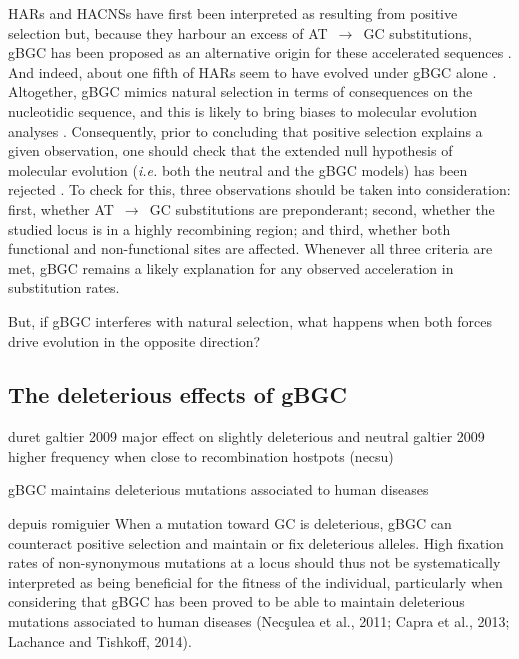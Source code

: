 HARs and HACNSs have first been interpreted as resulting from positive selection \citep[reviewed in][]{hubisz2014exploring} but, because they harbour an excess of AT~$\rightarrow$~GC substitutions, gBGC has been proposed as an alternative origin for these accelerated sequences \citep{galtier2007adaptation,berglund2009hotspots,duret2009comment,katzman2010gcbiased,ratnakumar2010detecting}.
And indeed, about one fifth of HARs seem to have evolved under gBGC alone \citep{kostka2012role}.\\


Altogether, gBGC mimics natural selection in terms of consequences on the nucleotidic sequence, and this is likely to bring biases to molecular evolution analyses \citep{ratnakumar2010detecting,romiguier2017analytical}.
Consequently, prior to concluding that positive selection explains a given observation, one should check that the extended null hypothesis of molecular evolution (\textit{i.e.} both the neutral and the gBGC models) has been rejected \citep{galtier2007adaptation, duret2009biased}.
To check for this, three observations should be taken into consideration: first, whether AT~$\rightarrow$~GC substitutions are preponderant; second, whether the studied locus is in a highly recombining region; and third, whether both functional and non-functional sites are affected.
Whenever all three criteria are met, gBGC remains a likely explanation for any observed acceleration in substitution rates.

But, if gBGC interferes with natural selection, what happens when both forces drive evolution in the opposite direction? 




\subsection{The deleterious effects of gBGC}


duret galtier 2009 major effect on slightly deleterious	and neutral
galtier 2009
higher frequency when close to recombination hostpots (necsu)

gBGC maintains deleterious mutations associated to human diseases \citep{necsulea2011meiotic,capra2013modelbased,lachance2014biased,xue2016basebiased}



depuis romiguier
When a mutation toward GC is deleterious, gBGC can counteract positive selection and maintain or fix deleterious alleles. High fixation rates of non-synonymous mutations at a locus should thus not be systematically interpreted as being beneficial for the fitness of the individual, particularly when considering that gBGC has been proved to be able to maintain deleterious mutations associated to human diseases (Necşulea et al., 2011; Capra et al., 2013; Lachance and Tishkoff, 2014).




